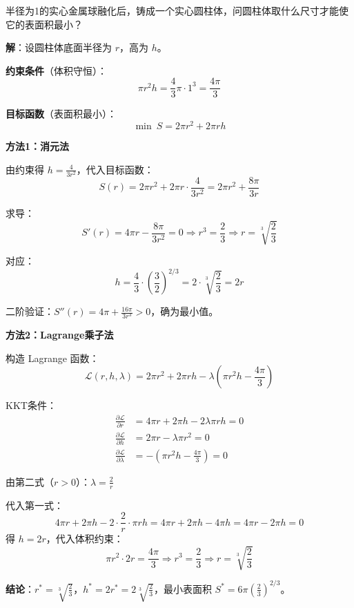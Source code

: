 \begin{example}[球的表面积最小化问题]\label{ex:sphere-cylinder}
半径为1的实心金属球融化后，铸成一个实心圆柱体，问圆柱体取什么尺寸才能使它的表面积最小？

\textbf{解}：设圆柱体底面半径为 $r$，高为 $h$。

\textbf{约束条件}（体积守恒）：
\[
\pi r^2 h = \frac{4}{3}\pi \cdot 1^3 = \frac{4\pi}{3}
\]

\textbf{目标函数}（表面积最小）：
\[
\min\ S = 2\pi r^2 + 2\pi rh
\]

\textbf{方法1：消元法}

由约束得 $h = \frac{4}{3r^2}$，代入目标函数：
\[
S(r) = 2\pi r^2 + 2\pi r \cdot \frac{4}{3r^2} = 2\pi r^2 + \frac{8\pi}{3r}
\]

求导：
\[
S'(r) = 4\pi r - \frac{8\pi}{3r^2} = 0 \Rightarrow r^3 = \frac{2}{3} \Rightarrow r = \sqrt[3]{\frac{2}{3}}
\]

对应：
\[
h = \frac{4}{3} \cdot \left(\frac{3}{2}\right)^{2/3} = 2 \cdot \sqrt[3]{\frac{2}{3}} = 2r
\]

二阶验证：$S''(r) = 4\pi + \frac{16\pi}{3r^3} > 0$，确为最小值。

\textbf{方法2：Lagrange乘子法}

构造 Lagrange 函数：
\[
\mathcal{L}(r, h, \lambda) = 2\pi r^2 + 2\pi rh - \lambda\left(\pi r^2 h - \frac{4\pi}{3}\right)
\]

KKT条件：
\begin{align*}
\frac{\partial \mathcal{L}}{\partial r} &= 4\pi r + 2\pi h - 2\lambda\pi r h = 0 \\
\frac{\partial \mathcal{L}}{\partial h} &= 2\pi r - \lambda\pi r^2 = 0 \\
\frac{\partial \mathcal{L}}{\partial \lambda} &= -\left(\pi r^2 h - \frac{4\pi}{3}\right) = 0
\end{align*}

由第二式（$r > 0$）：$\lambda = \frac{2}{r}$

代入第一式：
\[
4\pi r + 2\pi h - 2 \cdot \frac{2}{r} \cdot \pi r h = 4\pi r + 2\pi h - 4\pi h = 4\pi r - 2\pi h = 0
\]
得 $h = 2r$，代入体积约束：
\[
\pi r^2 \cdot 2r = \frac{4\pi}{3} \Rightarrow r^3 = \frac{2}{3} \Rightarrow r = \sqrt[3]{\frac{2}{3}}
\]

\textbf{结论}：$r^* = \sqrt[3]{\frac{2}{3}}$，$h^* = 2r^* = 2\sqrt[3]{\frac{2}{3}}$，最小表面积 $S^* = 6\pi\left(\frac{2}{3}\right)^{2/3}$。
\end{example}

